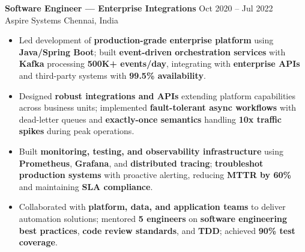 \documentclass[letterpaper,10pt]{article}
\newcommand{\resumeItem}[1]{\item\small #1}
\newcommand{\resumeSubheading}[4]{
  \vspace{6pt}
  \noindent
  \textbf{#1} \hfill {\footnotesize #2} \\
  [-1pt]
  \noindent
  \small #3 \hfill {\small #4}
  \vspace{3pt}
}
\newcommand{\resumeItemsStart}{\vspace{-2pt}\begin{itemize}}
\newcommand{\resumeItemsEnd}{\end{itemize}\vspace{6pt}}
\begin{document}
\resumeSubheading
{Software Engineer — Enterprise Integrations}{Oct 2020 -- Jul 2022}
{Aspire Systems}{Chennai, India}
\resumeItemsStart
\resumeItem{Led development of \textbf{production-grade enterprise platform} using \textbf{Java/Spring Boot}; built \textbf{event-driven orchestration services} with \textbf{Kafka} processing \textbf{500K+ events/day}, integrating with \textbf{enterprise APIs} and third-party systems with \textbf{99.5\% availability}.}
\resumeItem{Designed \textbf{robust integrations and APIs} extending platform capabilities across business units; implemented \textbf{fault-tolerant async workflows} with dead-letter queues and \textbf{exactly-once semantics} handling \textbf{10x traffic spikes} during peak operations.}
\resumeItem{Built \textbf{monitoring, testing, and observability infrastructure} using \textbf{Prometheus}, \textbf{Grafana}, and \textbf{distributed tracing}; \textbf{troubleshot production systems} with proactive alerting, reducing \textbf{MTTR by 60\%} and maintaining \textbf{SLA compliance}.}
\resumeItem{Collaborated with \textbf{platform, data, and application teams} to deliver automation solutions; mentored \textbf{5 engineers} on \textbf{software engineering best practices}, \textbf{code review standards}, and \textbf{TDD}; achieved \textbf{90\% test coverage}.}
\resumeItemsEnd
\vspace{-8pt}


\end{document}
